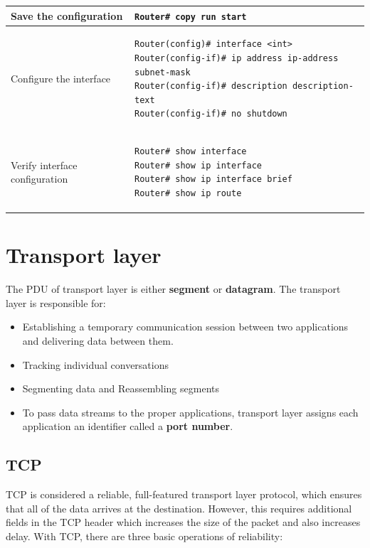 \begin{table}[hbtp]
\begin{tabular}{ll}
Save the configuration & \verb|Router# copy run start|\\ \hline

Configure the interface & 
\begin{minipage}{3in}
\begin{verbatim}
Router(config)# interface <int>
Router(config-if)# ip address ip-address subnet-mask
Router(config-if)# description description-text
Router(config-if)# no shutdown
\end{verbatim}
\end{minipage}\\ \hline

Verify interface configuration & 
\begin{minipage}{3in}
\begin{verbatim}
Router# show interface
Router# show ip interface
Router# show ip interface brief
Router# show ip route
\end{verbatim}
\end{minipage}\\ \hline

\bottomrule
\end{tabular}
\end{table}

\section{Transport layer}

The PDU of transport layer is either \textbf{segment} or \textbf{datagram}. The transport layer is responsible for:

\begin{itemize}
\item Establishing a temporary communication session between two applications and delivering data between them. 
\item Tracking individual conversations
\item Segmenting data and Reassembling segments
\item To pass data streams to the proper applications, transport layer assigns each application an identifier called a \textbf{port number}. 
\end{itemize}

\subsection{TCP}

TCP is considered a reliable, full-featured transport layer protocol, which ensures that all of the data arrives at the destination. However, this requires additional fields in the TCP header which increases the size of the packet and also increases delay. With TCP, there are three basic operations of reliability:

